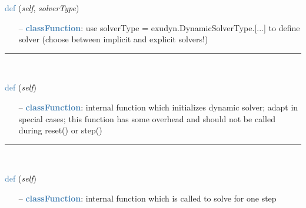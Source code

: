 \begin{itemize}[leftmargin=1.4cm]
\begin{flushleft}
\noindent \textcolor{steelblue}{def {\bf {}}}\label{sec:artificialIntelligence:OpenAIGymInterfaceEnv:SetSolver}
({\it self}, {\it solverType})
\end{flushleft}
\setlength{\itemindent}{0.7cm}
\begin{itemize}[leftmargin=0.7cm]
  \item[--]  \textcolor{steelblue}{\bf classFunction}: use solverType = exudyn.DynamicSolverType.[...] to define solver (choose between implicit and explicit solvers!)\vspace{12pt}\end{itemize}
%
\noindent\rule{8cm}{0.75pt}\vspace{1pt} \\ 
\begin{flushleft}
\noindent \textcolor{steelblue}{def {\bf {}}}\label{sec:artificialIntelligence:OpenAIGymInterfaceEnv:PreInitializeSolver}
({\it self})
\end{flushleft}
\setlength{\itemindent}{0.7cm}
\begin{itemize}[leftmargin=0.7cm]
  \item[--]  \textcolor{steelblue}{\bf classFunction}: internal function which initializes dynamic solver; adapt in special cases; this function has some overhead and should not be called during reset() or step()\vspace{12pt}\end{itemize}
%
\noindent\rule{8cm}{0.75pt}\vspace{1pt} \\ 
\begin{flushleft}
\noindent \textcolor{steelblue}{def {\bf {}}}\label{sec:artificialIntelligence:OpenAIGymInterfaceEnv:IntegrateStep}
({\it self})
\end{flushleft}
\setlength{\itemindent}{0.7cm}
\begin{itemize}[leftmargin=0.7cm]
  \item[--]  \textcolor{steelblue}{\bf classFunction}: internal function which is called to solve for one step\vspace{12pt}\end{itemize}

\end{itemize}
